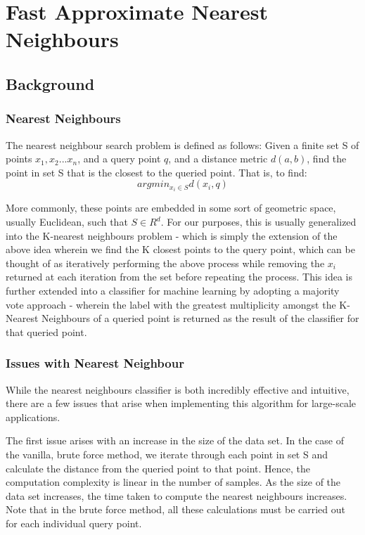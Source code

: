 
\section{Fast Approximate Nearest Neighbours} %
\subsection{Background} %

\subsubsection{Nearest Neighbours}
The nearest neighbour search problem is defined as follows: \newline
Given a finite set S of points $x_1, x_2...x_n $, and a query point $q $, and a distance metric $d(a,b)$, find the point in set S that is the closest to the queried point.  That is, to find: 
\begin{equation}
    arg min_{x_i \in S}d(x_i,q)
\end{equation}

More commonly, these points are embedded in some sort of geometric space, usually Euclidean, such that $S \in R^d$.\newline
For our purposes, this is usually generalized into the K-nearest neighbours problem - which is simply the extension of the above idea wherein we find the K closest points to the query point, which can be thought of as iteratively performing the above process while removing the $x_i$ returned at each iteration from the set before repeating the process. \newline
This idea is further extended into a classifier for machine learning by adopting a majority vote approach - wherein the label with the greatest multiplicity amongst the K-Nearest Neighbours of a queried point is returned as the result of the classifier for that queried point.  

\subsubsection{Issues with Nearest Neighbour}
While the nearest neighbours classifier is both incredibly effective and intuitive, there are a few issues that arise when implementing this algorithm for large-scale applications.\newline

The first issue arises with an increase in the size of the data set. In the case of the vanilla, brute force method, we iterate through each point in set S and calculate the distance from the queried point to that point. Hence, the computation complexity is linear in the number of samples. As the size of the data set increases, the time taken to compute the nearest neighbours increases. Note that in the brute force method, all these calculations must be carried out for each individual query point. \newline

